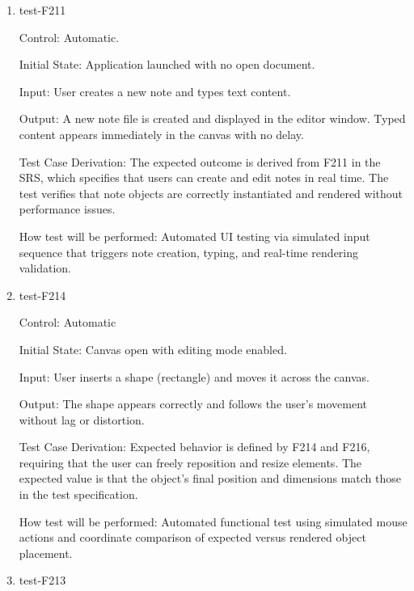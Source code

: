 \documentclass[12pt, titlepage]{article}
\begin{document}
\begin{enumerate}

\item{test-F211\\}

Control: Automatic.

Initial State: Application launched with no open document.

Input: User creates a new note and types text content.

Output:
A new note file is created and displayed in the editor window. Typed content appears
immediately in the canvas with no delay.

Test Case Derivation:
The expected outcome is derived from F211 in the SRS, which specifies that users can create and edit notes in real time.
The test verifies that note objects are correctly instantiated and rendered without performance issues.

How test will be performed: Automated UI testing via simulated input sequence that triggers note creation, typing,
and real-time rendering validation.

\item{test-F214\\}

Control: Automatic

Initial State: Canvas open with editing mode enabled.

Input: User inserts a shape (rectangle) and moves it across the canvas.

Output:
The shape appears correctly and follows the user’s movement without lag or distortion.

Test Case Derivation:
Expected behavior is defined by F214 and F216, requiring that the user can freely reposition and resize elements.
The expected value is that the object’s final position and dimensions match those in the test specification.

How test will be performed: Automated functional test using simulated mouse actions and coordinate comparison of
expected versus rendered object placement.

\item{test-F213\\}


\end{enumerate}
\end{document}
